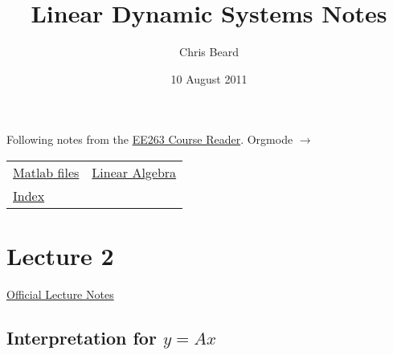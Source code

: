 \documentclass[10pt,letterpaper]{article}
\begin{document}
\title{Linear Dynamic Systems Notes}
\author{Chris Beard}
\date{10 August 2011}
\maketitle

\setcounter{tocdepth}{3}
\tableofcontents
\vspace*{1cm}
Following notes from the \href{file://.~/Desktop/Engineering/kiet-ee-downloads/current/ee263_course_reader.pdf}{EE263 Course Reader}. Orgmode $\rightarrow$ \LaTeXe

\begin{center}
\begin{tabular}{ll}
 \href{http://www.stanford.edu/~boyd/ee263/matlab/}{Matlab files}                                       &  \href{file://.~/Dropbox/AK-MBP/edu/systems/linear-algebra-notes.pdf}{Linear Algebra}  \\
 \href{file:///Users/FingerMan/Dropbox/AK-MBP/edu/systems/IntroToLinearDynamicalSys/index.html}{Index}  &                                                                                        \\
\end{tabular}
\end{center}


\section{Lecture 2}
\label{sec-1}

\href{file:///Users/FingerMan/Dropbox/AK-MBP/edu/systems/IntroToLinearDynamicalSys/materials/lsoeldsee263/02-lin-fcts.pdf}{Official Lecture Notes}
\subsection{Interpretation for $y=Ax$}
\label{sec-1_1}
\end{document}
